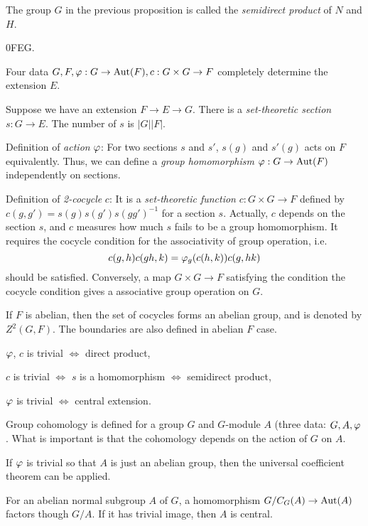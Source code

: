 \documentclass{../../large}
\begin{document}
\begin{defn}
The group $G$ in the previous proposition is called the \emph{semidirect product} of $N$ and $H$.
\end{defn}


\begin{es}
0\>F\>E\>G.
\end{es}
Four data $G,F,\varphi:G\to\operatorname{Aut}(F),c:G\times G\to F$ completely determine the extension $E$.

Suppose we have an extension $F\to E\to G$.
There is a \emph{set-theoretic section} $s:G\to E$.
The number of $s$ is $|G||F|$.

Definition of \emph{action} $\varphi$:
For two sections $s$ and $s'$, $s(g)$ and $s'(g)$ acts on $F$ equivalently.
Thus, we can define a \emph{group homomorphism} $\varphi:G\to\operatorname{Aut}(F)$ independently on sections.

Definition of \emph{2-cocycle} $c$:
It is a \emph{set-theoretic function} $c:G\times G\to F$ defined by $c(g,g')=s(g)s(g')s(gg')^{-1}$ for a section $s$.
Actually, $c$ depends on the section $s$, and $c$ measures how much $s$ fails to be a group homomorphism.
It requires the cocycle condition for the associativity of group operation, i.e.
\[c(g,h)c(gh,k)=\varphi_g(c(h,k))c(g,hk)\]
should be satisfied.
Conversely, a map $G\times G\to F$ satisfying the condition the cocycle condition gives a associative group operation on $G$.

If $F$ is abelian, then the set of cocycles forms an abelian group, and is denoted by $Z^2(G,F)$.
The boundaries are also defined in abelian $F$ case.


\begin{parts}
\item $\varphi$, $c$ is trivial $\iff$ direct product,
\item $c$ is trivial $\iff$ $s$ is a homomorphism $\iff$ semidirect product,
\item $\varphi$ is trivial $\iff$ central extension.
\end{parts}

Group cohomology is defined for a group $G$ and $G$-module $A$ (three data: $G,A,\varphi$.
What is important is that the cohomology depends on the action of $G$ on $A$.

If $\varphi$ is trivial so that $A$ is just an abelian group, then the universal coefficient theorem can be applied.




\begin{prb}
For an abelian normal subgroup $A$ of $G$, a homomorphism $G/C_G(A)\to\operatorname{Aut}(A)$ factors though $G/A$.
If it has trivial image, then $A$ is central.
\end{prb}
\end{document}
